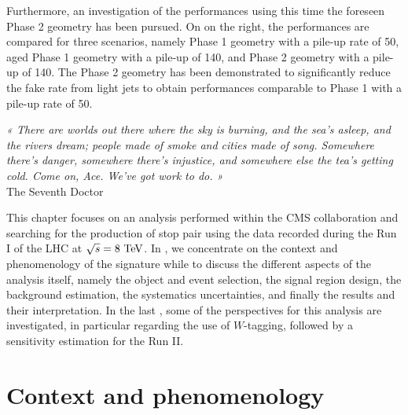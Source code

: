     Furthermore, an investigation of the performances using this time the
    foreseen Phase 2 geometry has been pursued. On
     on the right, the performances are compared
    for three scenarios, namely Phase 1 geometry with a pile-up rate of 50, aged
    Phase 1 geometry with a pile-up of 140, and Phase 2 geometry with a pile-up
    of 140. The Phase 2 geometry has been demonstrated to significantly reduce
    the fake rate from light jets to obtain performances comparable to Phase 1
    with a pile-up rate of 50.

\setcounter{mtc}{5}
\vspace*{-0.7cm}
\begin{center}
\begin{minipage}{0.95\textwidth}
\emph{« There are worlds out there where the sky is burning, and the sea’s
asleep, and the rivers dream; people made of smoke and cities made of song.
Somewhere there’s danger, somewhere there’s injustice, and somewhere else the
tea’s getting cold. Come on, Ace. We’ve got work to do. »}\\
\hspace*{0.75\textwidth} The Seventh Doctor
\end{minipage}
\end{center}

\minitoc
\newpage

    This chapter focuses on an analysis performed within the CMS collaboration
    and searching for the production of stop pair using the data recorded during
    the Run I of the LHC at $\sqrt{s} = 8~\text{TeV}$. In
    , we concentrate on the context and
    phenomenology of the signature while  to
     discuss the different aspects of the
    analysis itself, namely the object and event selection, the signal region
    design, the background estimation, the systematics uncertainties, and
    finally the results and their interpretation. In the last
    , some of the perspectives for this
    analysis are investigated, in particular regarding the use of $W$-tagging,
    followed by a sensitivity estimation for the Run II.

    \section{Context and phenomenology \label{sec:analysis_contextAndPheno}}

